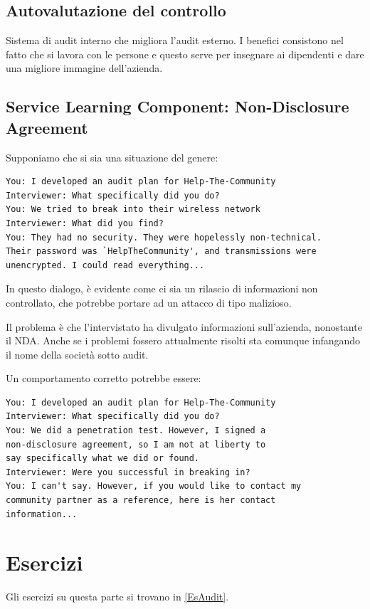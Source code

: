 \subsection{Autovalutazione del controllo}

Sistema di audit interno che migliora l'audit esterno. I benefici consistono
nel fatto che si lavora con le persone e questo serve per insegnare ai
dipendenti e dare una migliore immagine dell'azienda.


\subsection{Service Learning Component: Non-Disclosure Agreement}

Supponiamo che si sia una situazione del genere:

\begin{verbatim}
You: I developed an audit plan for Help-The-Community
Interviewer: What specifically did you do?
You: We tried to break into their wireless network
Interviewer: What did you find?
You: They had no security. They were hopelessly non-technical.
Their password was `HelpTheCommunity', and transmissions were
unencrypted. I could read everything...
\end{verbatim}

In questo dialogo, è evidente come ci sia un rilascio di informazioni non
controllato, che potrebbe portare ad un attacco di tipo malizioso.

Il problema è che l'intervistato ha divulgato informazioni sull'azienda,
nonostante il NDA. Anche se i problemi fossero attualmente risolti sta comunque
infangando il nome della società sotto audit.


Un comportamento corretto potrebbe essere:
\begin{verbatim}
You: I developed an audit plan for Help-The-Community
Interviewer: What specifically did you do?
You: We did a penetration test. However, I signed a
non-disclosure agreement, so I am not at liberty to
say specifically what we did or found.
Interviewer: Were you successful in breaking in?
You: I can't say. However, if you would like to contact my
community partner as a reference, here is her contact
information...
\end{verbatim}

\section{Esercizi}
Gli esercizi su questa parte si trovano in \ref{EsAudit}.

